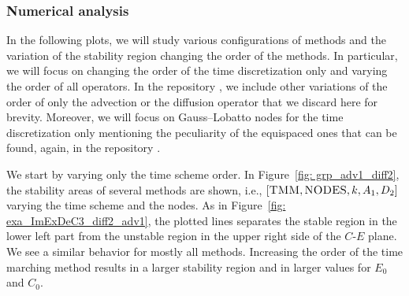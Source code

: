 \subsubsection{Numerical analysis}
In the following plots, we will study various configurations of methods and the variation of the stability region changing the order of the methods. In particular, we will focus on changing the order of the time discretization only and varying the order of all operators. In the repository \cite{ourrepo}, we include other variations of the order of only the advection or the diffusion operator that we discard here for brevity. Moreover, we will focus on Gauss--Lobatto nodes for the time discretization only mentioning the peculiarity of the equispaced ones that can be found, again, in the repository \cite{ourrepo}.

We start by varying only the time scheme order. 
In Figure~\ref{fig: grp_adv1_diff2}, the stability areas of several methods are shown, i.e., $[\textsc{TMM},\textsc{NODES},k, A_1,D_2]$ varying the time scheme and the nodes. 
As in Figure~\ref{fig: exa_ImExDeC3_diff2_adv1}, the plotted lines separates the stable region in the lower left part from the unstable region in the upper right side of the $C$-$E$ plane. 
We see a similar behavior for mostly all methods. 
Increasing the order of the time marching method results in a larger stability region and in larger values for $E_0$ and $C_0$. 


